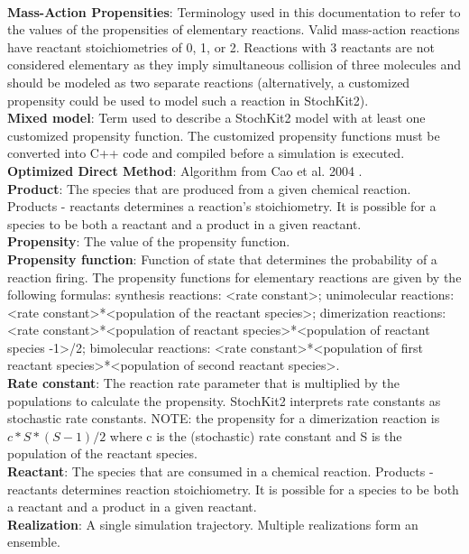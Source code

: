 \documentclass[11pt,letterpaper]{article}
\begin{document}
\begin{itemize}
\\\textbf{Mass-Action Propensities}: Terminology used in this documentation to refer to the values of the propensities of elementary reactions.  Valid mass-action reactions have reactant stoichiometries of 0, 1, or 2.  Reactions with 3 reactants are not considered elementary as they imply simultaneous collision of three molecules and should be modeled as two separate reactions (alternatively, a customized propensity could be used to model such a reaction in StochKit2).
    \\\textbf{Mixed model}: Term used to describe a StochKit2 model with at least one customized propensity function.  The customized propensity functions must be converted into C++ code and compiled before a simulation is executed.
    \\\textbf{Optimized Direct Method}: Algorithm from Cao et al. 2004 \cite{Cao2004}. 
    \\\textbf{Product}: The species that are produced from a given chemical reaction.  Products - reactants determines a reaction's stoichiometry.  It is possible for a species to be both a reactant and a product in a given reactant.
    \\\textbf{Propensity}: The value of the propensity function.
    \\\textbf{Propensity function}: Function of state that determines the probability of a reaction firing.  The propensity functions for elementary reactions are given by the following formulas: synthesis reactions: <rate constant>; unimolecular reactions: <rate constant>*<population of the reactant species>; dimerization reactions: <rate constant>*<population of reactant species>*<population of reactant species -1>/2; bimolecular reactions: <rate constant>*<population of first reactant species>*<population of second reactant species>.
    \\\textbf{Rate constant}: The reaction rate parameter that is multiplied by the populations to calculate the propensity.  StochKit2 interprets rate constants as stochastic rate constants.  NOTE: the propensity for a dimerization reaction is $c*S*(S-1)/2$ where c is the (stochastic) rate constant and S is the population of the reactant species.
    \\\textbf{Reactant}: The species that are consumed in a chemical reaction.  Products - reactants determines reaction stoichiometry.  It is possible for a species to be both a reactant and a product in a given reactant.
    \\\textbf{Realization}: A single simulation trajectory.  Multiple realizations form an ensemble.

\end{itemize}
\end{document}
